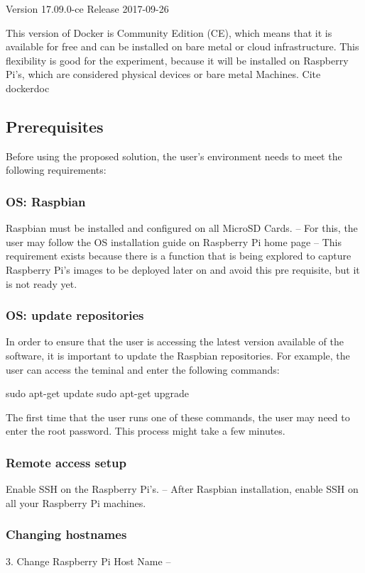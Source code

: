 \documentclass[sigconf]{acmart}
\begin{document}
	Version 17.09.0-ce
	Release 2017-09-26
	
	This version of Docker is Community Edition (CE), which means that it is available for free and can be installed on bare metal or cloud infrastructure. This flexibility is good for the experiment, because it will be installed on Raspberry Pi’s, which are considered physical devices or bare metal Machines.
	Cite dockerdoc
	
	\subsection{Prerequisites}
	
	Before using the proposed solution, the user’s environment needs to meet the following requirements:
	
	\subsubsection{OS: Raspbian}
	Raspbian must be installed and configured on all MicroSD Cards. – For this, the user may follow the OS installation guide on Raspberry Pi home page –
	This requirement exists because there is a function that is being explored to capture Raspberry Pi’s images to be deployed later on and avoid this pre requisite, but it is not ready yet.
	
	\subsubsection{OS: update repositories}
	In order to ensure that the user is accessing the latest version available of the software, it is important to update the Raspbian repositories. For example, the user can access the teminal and enter the following commands:
	
	sudo apt-get update
	sudo apt-get upgrade
	
	The first time that the user runs one of these commands, the user may need to enter the root password.
	This process might take a few minutes.
	
	\subsubsection{Remote access setup}
	Enable SSH on the Raspberry Pi’s. – After Raspbian installation, enable SSH on all your Raspberry Pi machines. 
	
	\subsubsection{Changing hostnames}
	3. Change Raspberry Pi Host Name –
	
\end{document}
